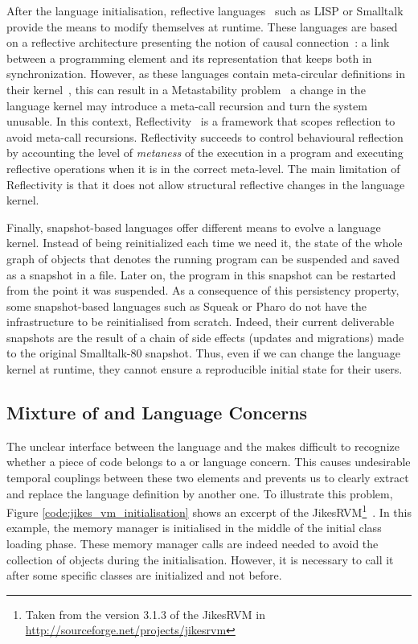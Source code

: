 
After the language initialisation, reflective languages~\cite{Smit84a} such as LISP or Smalltalk provide the means to modify themselves at runtime. These languages are based on a reflective architecture presenting the notion of causal connection~\cite{Maes87a}: a link between a programming element and its representation that keeps both in synchronization. However, as these languages contain meta-circular definitions in their kernel~\cite{Chib96a}, this can result in a Metastability problem~\cite{Kicz91a} \ie a change in the language kernel may introduce a meta-call recursion and turn the system unusable. In this context, Reflectivity~\cite{Denk08b} is a framework that scopes reflection to avoid meta-call recursions.  Reflectivity succeeds to control behavioural reflection by accounting the level of \emph{metaness} of the execution in a program and executing reflective operations when it is in the correct meta-level. The main limitation of Reflectivity is that it does not allow structural reflective changes in the language kernel.

Finally, snapshot-based languages offer different means to evolve a language kernel. Instead of being reinitialized each time we need it, the state of the whole graph of objects that denotes the running program can be suspended and saved as a snapshot in a file. Later on, the program in this snapshot can be restarted from the point it was suspended. As a consequence of this persistency property, some snapshot-based languages such as Squeak or Pharo  do not have the infrastructure to be reinitialised from scratch. Indeed, their current deliverable snapshots are the result of a chain of side effects (updates and migrations) made to the original Smalltalk-80 snapshot. Thus, even if we can change the language kernel at runtime, they cannot ensure a reproducible initial state for their users.

\subsection{Mixture of \VM and Language Concerns}

The unclear interface between the language and the \VM makes difficult to recognize whether a piece of code belongs to a \VM or language concern. This causes undesirable temporal couplings between these two elements and prevents us to clearly extract and replace the language definition by another one.
To illustrate this problem, Figure \ref{code:jikes_vm_initialisation} shows an excerpt of the JikesRVM\footnote{Taken from the version 3.1.3 of the JikesRVM in \url{http://sourceforge.net/projects/jikesrvm}}~\cite{Alpe00a}. In this example, the memory manager is initialised in the middle of the initial class loading phase. These memory manager calls are indeed needed to avoid the collection of objects during the initialisation. However, it is necessary to call it after some specific classes are initialized and not before.

